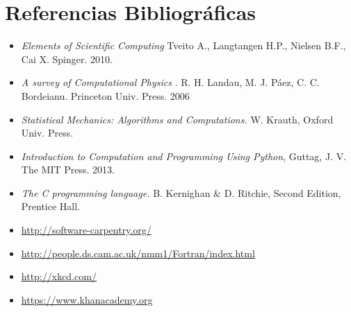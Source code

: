 \documentclass[11pt]{article}
\begin{document}
\newpage

\section*{Referencias Bibliogr\'aficas}

\begin{itemize}
\item
\textit{Elements of Scientific Computing}
Tveito A., Langtangen H.P., Nielsen B.F., Cai X. Spinger. 2010.
\item
\textit{A survey of Computational Physics}
. R. H. Landau, M. J. P\'aez, C. C. Bordeianu. Princeton Univ. Press. 2006
\item 
\textit{Statistical Mechanics: Algorithms and Computations.}
W. Krauth, Oxford Univ. Press. 
\item 
\textit{Introduction to Computation and Programming Using Python},
Guttag, J. V. The MIT Press. 2013.
\item 
\textit{The C programming language.}
 B. Kernighan \& D. Ritchie, Second Edition, Prentice Hall.
\item\url{http://software-carpentry.org/}
\item\url{http://people.ds.cam.ac.uk/nmm1/Fortran/index.html}
\item\url{http://xkcd.com/}
\item\url{https://www.khanacademy.org}
\end{itemize}

 
\end{document}
